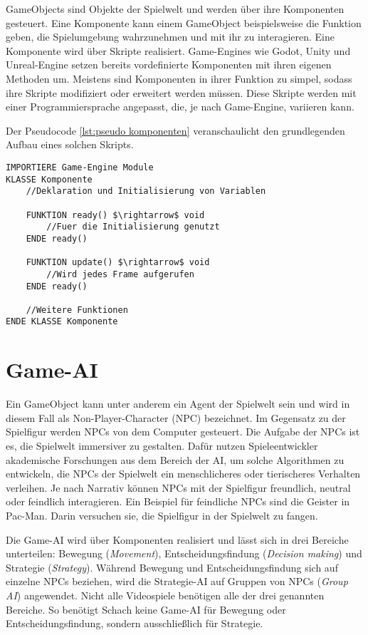 GameObjects sind Objekte der Spielwelt und werden \"{u}ber ihre Komponenten gesteuert. Eine Komponente kann einem GameObject beispielsweise die Funktion geben, die Spielumgebung wahrzunehmen und mit ihr zu interagieren. Eine Komponente wird \"{u}ber Skripte realisiert. Game-Engines wie Godot, Unity und Unreal-Engine setzen bereits vordefinierte Komponenten mit ihren eigenen Methoden um. Meistens sind Komponenten in ihrer Funktion zu simpel, sodass ihre Skripte modifiziert oder erweitert werden m\"{u}ssen. Diese Skripte werden mit einer Programmiersprache angepasst, die, je nach Game-Engine, variieren kann.

Der Pseudocode \ref{lst:pseudo komponenten} veranschaulicht den grundlegenden Aufbau eines solchen Skripts.

\begin{lstlisting}[language=Pseudo, caption={Aufbau eines Komponenten Skripts}, mathescape=true, label={lst:pseudo komponenten}]
IMPORTIERE Game-Engine Module
KLASSE Komponente
	//Deklaration und Initialisierung von Variablen
	
	FUNKTION ready() $\rightarrow$ void
		//Fuer die Initialisierung genutzt
	ENDE ready()

	FUNKTION update() $\rightarrow$ void
		//Wird jedes Frame aufgerufen
	ENDE ready()
	
	//Weitere Funktionen
ENDE KLASSE Komponente

\end{lstlisting}

\section{Game-AI}
\label{chap:game-ai}

Ein GameObject kann unter anderem ein Agent der Spielwelt sein und wird in diesem Fall als Non-Player-Character (NPC) bezeichnet. Im Gegensatz zu der Spielfigur werden NPCs von dem Computer gesteuert. Die Aufgabe der NPCs ist es, die Spielwelt immersiver zu gestalten. Daf\"{u}r nutzen Spieleentwickler akademische Forschungen aus dem Bereich der AI, um solche Algorithmen zu entwickeln, die NPCs der Spielwelt ein menschlicheres oder tierischeres Verhalten verleihen. Je nach Narrativ k\"{o}nnen NPCs mit der Spielfigur freundlich, neutral oder feindlich interagieren. Ein Beispiel f\"{u}r feindliche NPCs sind die Geister in Pac-Man. Darin versuchen sie, die Spielfigur in der Spielwelt zu fangen.

Die Game-AI wird \"{u}ber Komponenten realisiert und l\"{a}sst sich in drei Bereiche unterteilen: Bewegung (\textit{Movement}), Entscheidungsfindung (\textit{Decision making}) und Strategie (\textit{Strategy}). W\"{a}hrend Bewegung und Entscheidungsfindung sich auf einzelne NPCs beziehen, wird die Strategie-AI auf Gruppen von NPCs (\textit{Group AI}) angewendet. Nicht alle Videospiele ben\"{o}tigen alle der drei genannten Bereiche. So ben\"{o}tigt Schach keine Game-AI f\"{u}r Bewegung oder Entscheidungsfindung, sondern ausschlie\ss{}lich f\"{u}r Strategie.

